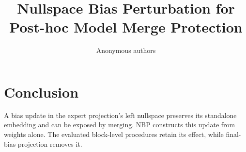 \documentclass[10pt,twocolumn,letterpaper]{article}
\title{Nullspace Bias Perturbation for Post-hoc Model Merge Protection}
\author{Anonymous authors}
\begin{document}
\maketitle






\section{Conclusion}
A bias update in the expert projection's left nullspace preserves its standalone embedding and can be exposed by merging. NBP constructs this update from weights alone. The evaluated block-level procedures retain its effect, while final-bias projection removes it.
\clearpage
{\small


}
\end{document}
